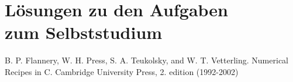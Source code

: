 \documentclass[a4paper,11pt]{book}
\begin{document}
\chapter{Lösungen zu den Aufgaben\\ zum Selbststudium}




\begin{thebibliography}{------}
     B. P. Flannery, W. H. Press, S. A. Teukolsky, and W. T. Vetterling. Numerical Recipes in C. Cambridge University Press, 2. edition (1992-2002)
\end{thebibliography}
\end{document}
